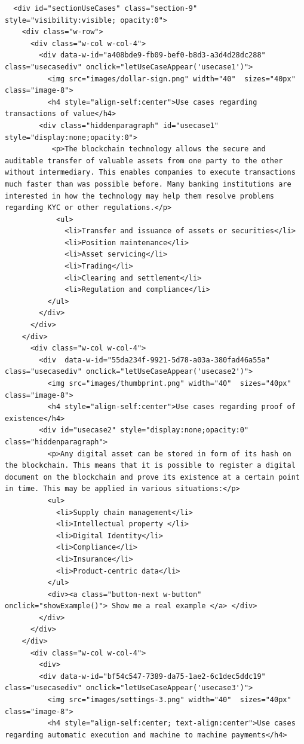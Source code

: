 \begin{lstlisting}
  <div id="sectionUseCases" class="section-9" style="visibility:visible; opacity:0">
    <div class="w-row">
      <div class="w-col w-col-4">
        <div data-w-id="a408bde9-fb09-bef0-b8d3-a3d4d28dc288" class="usecasediv" onclick="letUseCaseAppear('usecase1')">
          <img src="images/dollar-sign.png" width="40"  sizes="40px" class="image-8">
          <h4 style="align-self:center">Use cases regarding transactions of value</h4>
        <div class="hiddenparagraph" id="usecase1" style="display:none;opacity:0">
           <p>The blockchain technology allows the secure and auditable transfer of valuable assets from one party to the other without intermediary. This enables companies to execute transactions much faster than was possible before. Many banking institutions are interested in how the technology may help them resolve problems regarding KYC or other regulations.</p>
            <ul>
              <li>Transfer and issuance of assets or securities</li>
              <li>Position maintenance</li>
              <li>Asset servicing</li>
              <li>Trading</li>
              <li>Clearing and settlement</li>
              <li>Regulation and compliance</li>
          </ul>
        </div>
      </div>
    </div>
      <div class="w-col w-col-4">
        <div  data-w-id="55da234f-9921-5d78-a03a-380fad46a55a" class="usecasediv" onclick="letUseCaseAppear('usecase2')">
          <img src="images/thumbprint.png" width="40"  sizes="40px" class="image-8">
          <h4 style="align-self:center">Use cases regarding proof of existence</h4>
        <div id="usecase2" style="display:none;opacity:0" class="hiddenparagraph">
          <p>Any digital asset can be stored in form of its hash on the blockchain. This means that it is possible to register a digital document on the blockchain and prove its existence at a certain point in time. This may be applied in various situations:</p>
          <ul>
            <li>Supply chain management</li>
            <li>Intellectual property </li>
            <li>Digital Identity</li>
            <li>Compliance</li>
            <li>Insurance</li>
            <li>Product-centric data</li>
          </ul>
          <div><a class="button-next w-button" onclick="showExample()"> Show me a real example </a> </div>
        </div>
      </div>
    </div>
      <div class="w-col w-col-4">
        <div>
        <div data-w-id="bf54c547-7389-da75-1ae2-6c1dec5ddc19" class="usecasediv" onclick="letUseCaseAppear('usecase3')">
          <img src="images/settings-3.png" width="40"  sizes="40px" class="image-8">
          <h4 style="align-self:center; text-align:center">Use cases regarding automatic execution and machine to machine payments</h4>

\end{lstlisting}
